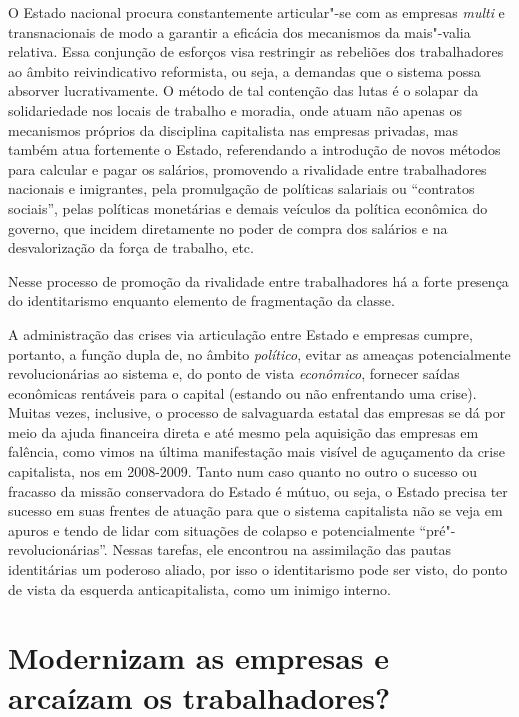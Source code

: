 O Estado nacional procura constantemente articular"-se com as empresas
\emph{multi} e transnacionais de modo a garantir a eficácia dos
mecanismos da mais"-valia relativa. Essa conjunção de esforços visa
restringir as rebeliões dos trabalhadores ao âmbito reivindicativo
reformista, ou seja, a demandas que o sistema possa absorver
lucrativamente. O método de tal contenção das lutas é o solapar da
solidariedade nos locais de trabalho e moradia, onde atuam não apenas os
mecanismos próprios da disciplina capitalista nas empresas privadas, mas
também atua fortemente o Estado, referendando a introdução de novos
métodos para calcular e pagar os salários, promovendo a rivalidade entre
trabalhadores nacionais e imigrantes, pela promulgação de políticas
salariais ou ``contratos sociais'', pelas políticas monetárias e demais
veículos da política econômica do governo, que incidem diretamente no
poder de compra dos salários e na desvalorização da força de trabalho,
etc.

Nesse processo de promoção da rivalidade entre trabalhadores há a forte
presença do identitarismo enquanto elemento de fragmentação da classe.

A administração das crises via articulação entre Estado e empresas
cumpre, portanto, a função dupla de, no âmbito \emph{político}, evitar
as ameaças potencialmente revolucionárias ao sistema e, do ponto de
vista \emph{econômico}, fornecer saídas econômicas rentáveis para o
capital (estando ou não enfrentando uma crise). Muitas vezes, inclusive,
o processo de salvaguarda estatal das empresas se dá por meio da ajuda
financeira direta e até mesmo pela aquisição das empresas em falência,
como vimos na última manifestação mais visível de aguçamento da crise
capitalista, nos  em 2008-2009. Tanto num caso quanto no outro o
sucesso ou fracasso da missão conservadora do Estado é mútuo, ou seja, o
Estado precisa ter sucesso em suas frentes de atuação para que o sistema
capitalista não se veja em apuros e tendo de lidar com situações de
colapso e potencialmente ``pré"-revolucionárias''. Nessas tarefas, ele
encontrou na assimilação das pautas identitárias um poderoso aliado, por
isso o identitarismo pode ser visto, do ponto de vista da esquerda
anticapitalista, como um inimigo interno.

\chapter*{Modernizam as empresas e arcaízam os trabalhadores?}

